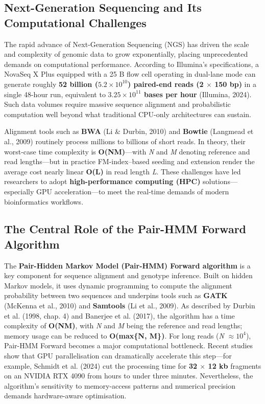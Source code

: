 \documentclass[12pt]{report}
\begin{document}
\subsection{Next-Generation Sequencing and Its Computational Challenges}
The rapid advance of Next-Generation Sequencing (NGS) has driven the scale and complexity of genomic data to grow exponentially, placing unprecedented demands on computational performance. According to Illumina’s specifications, a NovaSeq X Plus equipped with a 25 B flow cell operating in dual-lane mode can generate roughly \textbf{52 billion ($5.2 \times 10^{10}$) paired-end reads (2 $\times$ 150 bp)} in a single 48-hour run, equivalent to \textbf{$3.25 \times 10^{11}$ bases per hour} (Illumina, 2024). Such data volumes require massive sequence alignment and probabilistic computation well beyond what traditional CPU-only architectures can sustain.

Alignment tools such as \textbf{BWA} (Li \& Durbin, 2010) and \textbf{Bowtie} (Langmead et al., 2009) routinely process millions to billions of short reads. In theory, their worst-case time complexity is \textbf{O(NM)}—with \emph{N} and \emph{M} denoting reference and read lengths—but in practice FM-index–based seeding and extension render the average cost nearly linear \textbf{O(L)} in read length \emph{L}. These challenges have led researchers to adopt \textbf{high-performance computing (HPC)} solutions—especially GPU acceleration—to meet the real-time demands of modern bioinformatics workflows.

\subsection{The Central Role of the Pair-HMM Forward Algorithm}
The \textbf{Pair-Hidden Markov Model (Pair-HMM) Forward algorithm} is a key component for sequence alignment and genotype inference. Built on hidden Markov models, it uses dynamic programming to compute the alignment probability between two sequences and underpins tools such as \textbf{GATK} (McKenna et al., 2010) and \textbf{Samtools} (Li et al., 2009). As described by Durbin et al. (1998, chap. 4) and Banerjee et al. (2017), the algorithm has a time complexity of \textbf{O(NM)}, with \emph{N} and \emph{M} being the reference and read lengths; memory usage can be reduced to \textbf{O(max\{N, M\})}. For long reads (\emph{N} $\approx 10^4$), Pair-HMM Forward becomes a major computational bottleneck. Recent studies show that GPU parallelisation can dramatically accelerate this step—for example, Schmidt et al. (2024) cut the processing time for \textbf{32 $\times$ 12 kb} fragments on an NVIDIA RTX 4090 from hours to under three minutes. Nevertheless, the algorithm’s sensitivity to memory-access patterns and numerical precision demands hardware-aware optimisation.
\end{document}
